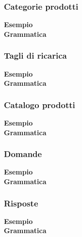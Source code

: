 \documentclass[a4paper, 14pt]{article}
\begin{document}
\begin{flushleft}
				\subsubsection{Categorie prodotti}
					\textbf{Esempio}\\ 
					
					\bigskip \textbf{Grammatica}\\
					
				\subsubsection{Tagli di ricarica}
					\textbf{Esempio}\\ 
						
					\bigskip \textbf{Grammatica}\\
						
				\subsubsection{Catalogo prodotti}
					\textbf{Esempio}\\ 
					
					\bigskip \textbf{Grammatica}\\
					
				\subsubsection{Domande}
					\textbf{Esempio}\\ 
					
					\bigskip \textbf{Grammatica}\\
					
				\subsubsection{Risposte}
					\textbf{Esempio}\\ 
					
					\bigskip \textbf{Grammatica}\\
					
				\newpage

\end{flushleft}
\end{document}
